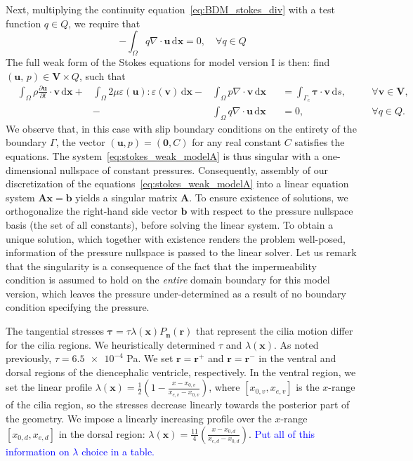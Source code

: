 \documentclass[fleqn]{wlscirep}
\newcommand{\pdifft}[1]{\frac{\partial  #1}{\partial t}}
\newcommand{\intO}[1]{\int_{\Omega}#1 \, \mathrm d\bm{x}}
\newcommand{\intGc}[1]{\int_{\Gamma_c}#1 \, \mathrm ds}
\newcommand{\nn}{\mathbf{n}}
\newcommand{\rr}{\mathbf{r}}
\newcommand{\uu}{\mathbf{u}}
\newcommand{\vv}{\mathbf{v}}
\newcommand{\xx}{\bm{x}}
\newcommand{\VV}{\mathbf{V}}
\newcommand{\btau}{\bm{\tau}}
\newcommand{\lyng}[1]{\textcolor{blue}{#1}}
\begin{document}
Next, multiplying the continuity equation~\eqref{eq:BDM_stokes_div} with a test function $q\in Q$, we require that
\begin{equation}
    -\intO{q\nabla\cdot\uu} = 0,\quad\forall q\in Q
    \label{eq:pressure_weak_form}
\end{equation}
The full weak form of the Stokes equations for model version I is then: find $(\uu, \, p) \in \VV\times Q$, such that
\begin{subequations}
    \begin{alignat}{5}
        &\intO{\rho\pdifft{\uu}\cdot\vv} + &\intO{2\mu\varepsilon(\uu) : \varepsilon(\vv)} - &\intO{p\nabla\cdot\vv} &&= \intGc{\btau\cdot\vv}, &&\quad\forall\vv\in\VV, \label{eq:stokes_weak_mom_modelA}\\ 
        &{} &{}  -&\intO{q\nabla\cdot\uu} &&= 0, &&\quad\forall q\in Q. \label{eq:stokes_weak_cont_modelA}
    \end{alignat}%
    \label{eq:stokes_weak_modelA}%
\end{subequations}%
We observe that, in this case with slip boundary conditions on the entirety of the boundary $\Gamma$, the
vector $(\uu, p)=(\mathbf{0}, C)$ for any real constant $C$ satisfies the equations.
The system~\eqref{eq:stokes_weak_modelA} is thus singular with a one-dimensional nullspace of constant pressures.
Consequently, assembly of our discretization of the  equations~\eqref{eq:stokes_weak_modelA} into a
linear equation system $\mathbf{A}\xx=\mathbf{b}$ yields a singular matrix $\mathbf{A}$.
To ensure existence of solutions, we orthogonalize the right-hand side vector $\mathbf{b}$ with
respect to the pressure nullspace basis (the set of all constants), before solving the linear system.
To obtain a unique solution, which together with existence renders the problem well-posed,
information of the pressure nullspace is passed to the linear solver. Let us remark that
the singularity is a consequence of the fact that the impermeability condition is assumed
to hold on the \emph{entire} domain boundary for this model version, which leaves the
pressure under-determined as a result of no boundary condition specifying the pressure.

The tangential stresses $\btau = \tau\lambda(\xx) P_{\nn}(\rr)$ that represent the cilia
motion differ for the cilia regions. We heuristically determined $\tau$ and $\lambda(\xx)$.
As noted previously, $\tau=\num{6.5e-4}$ Pa. We set $\rr = \rr^+$ and $\rr = \rr^-$ in
the ventral and dorsal regions of the diencephalic ventricle, respectively. In the ventral region,
we set the linear profile $\lambda(\xx) = \frac{1}{2}\left(1 - \frac{x-x_{0, v}}{x_{e, v} - x_{0, v}}\right)$,
where $[x_{0, v}, x_{e, v}]$ is the $x$-range of the cilia region, so the stresses decrease
linearly towards the posterior part of the geometry. We impose a linearly increasing profile
over the $x$-range $[x_{0, d}, x_{e, d}]$ in the dorsal region:
$\lambda(\xx)=\frac{11}{4}\left(\frac{x-x_{0, d}}{x_{e, d} - x_{0, d}}\right)$.
\lyng{Put all of this information on $\lambda$ choice in a table.}
\end{document}
